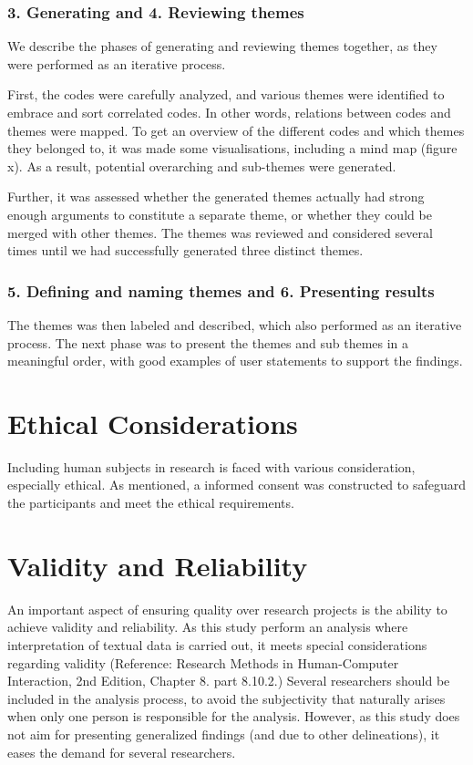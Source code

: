     \subsubsection{3. Generating and 4. Reviewing themes}
    We describe the phases of generating and reviewing themes together, as they were performed as an iterative process. 
    
    First, the codes were carefully analyzed, and various themes were identified to embrace and sort correlated codes. In other words, relations between codes and themes were mapped. To get an overview of the different codes and which themes they belonged to, it was made some visualisations, including a mind map (figure x). As a result, potential overarching and sub-themes were generated. 
    
    Further, it was assessed whether the generated themes actually had strong enough arguments to constitute a separate theme, or whether they could be merged with other themes. The themes was reviewed and considered several times until we had successfully generated three distinct themes.

    \subsubsection{5. Defining and naming themes and 6. Presenting results}
    The themes was then labeled and described, which also performed as an iterative process. The next phase was to present the themes and sub themes in a meaningful order, with good examples of user statements to support the findings.  

    \section{Ethical Considerations}
    Including human subjects in research is faced with various consideration, especially ethical. As mentioned, a informed consent was constructed to safeguard the participants and meet the ethical requirements. 


    \section{Validity and Reliability}
    An important aspect of ensuring quality over research projects is the ability to achieve validity and reliability. As this study perform an analysis where interpretation of textual data is carried out, it meets special considerations regarding validity (Reference: Research Methods in Human-Computer Interaction, 2nd Edition, Chapter 8. part 8.10.2.) Several researchers should be included in the analysis process, to avoid the subjectivity that naturally arises when only one person is responsible for the analysis. However, as this study does not aim for presenting generalized findings (and due to other delineations), it eases the demand for several researchers. 

